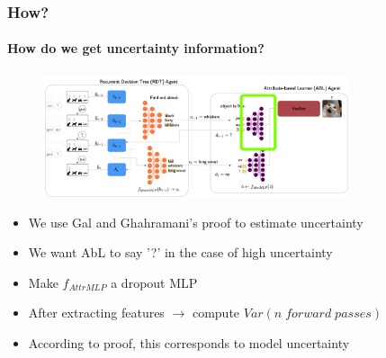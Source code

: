 \documentclass[9pt]{beamer}
\begin{document}
\begin{frame}
\frametitle{How?}
\framesubtitle{How do we get uncertainty information?}\begin{figure}
	\centering
	\includegraphics[width=0.8\textwidth]{images/where_is_uncertainty.pdf} 
\end{figure}
\begin{itemize}
	\item We use Gal and Ghahramani's \cite{gal2016dropout} proof to estimate uncertainty 
	\item We want AbL to say '?' in the case of high uncertainty
	\item Make $f_{AttrMLP}$ a dropout MLP
	\item After extracting features $\rightarrow$ compute $Var(n \;forward\;passes)$
	\item According to proof, this corresponds to model uncertainty
\end{itemize}
\end{frame}



\end{document}
